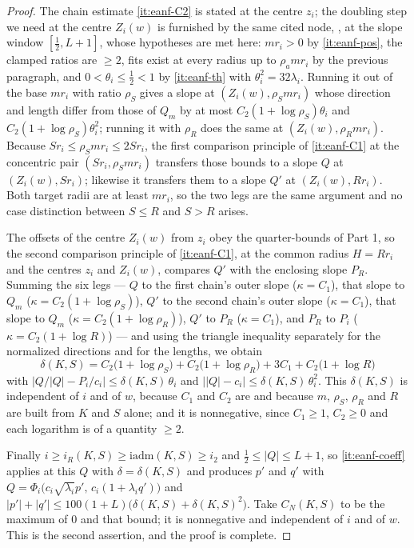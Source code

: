 \begin{proof}
The chain estimate \ref{it:eanf-C2} is stated at the centre $z_i$; the
doubling step we need at the centre $Z_i(w)$ is furnished by the same cited
node, , at the slope window
$[\tfrac12,L+1]$, whose hypotheses are met here: $mr_i>0$ by
\ref{it:eanf-pos}, the clamped ratios are $\ge2$, fits exist at every radius up
to $\rho_amr_i$ by the previous paragraph, and $0<\theta_i\le\tfrac12<1$ by
\ref{it:eanf-th} with $\theta_i^2=32\lambda_i$. Running it out of the base
$mr_i$ with ratio $\rho_S$ gives a slope at $(Z_i(w),\rho_Smr_i)$ whose
direction and length differ from those of $Q_m$ by at most
$C_2(1+\log\rho_S)\theta_i$ and $C_2(1+\log\rho_S)\theta_i^2$; running it with
$\rho_R$ does the same at $(Z_i(w),\rho_Rmr_i)$. Because $S r_i\le\rho_Smr_i\le
2Sr_i$, the first comparison principle of \ref{it:eanf-C1} at the concentric
pair $(Sr_i,\rho_Smr_i)$ transfers those bounds to a slope $Q$ at
$(Z_i(w),Sr_i)$; likewise it transfers them to a slope $Q'$ at
$(Z_i(w),Rr_i)$. Both target radii are at least $mr_i$, so the two legs are the
same argument and no case distinction between $S\le R$ and $S>R$ arises.

The offsets of the centre $Z_i(w)$ from $z_i$ obey the quarter-bounds of
Part 1, so the second comparison principle of \ref{it:eanf-C1}, at the common
radius $H=Rr_i$ and the centres $z_i$ and $Z_i(w)$, compares $Q'$ with the
enclosing slope $P_R$. Summing the six legs --- $Q$ to the first chain's outer
slope ($\kappa=C_1$), that slope to $Q_m$ ($\kappa=C_2(1+\log\rho_S)$), $Q'$ to
the second chain's outer slope ($\kappa=C_1$), that slope to $Q_m$
($\kappa=C_2(1+\log\rho_R)$), $Q'$ to $P_R$ ($\kappa=C_1$), and $P_R$ to $P_i$
($\kappa=C_2(1+\log R)$) --- and using the triangle inequality separately for
the normalized directions and for the lengths, we obtain
\[
  \delta(K,S)=C_2\bigl(1+\log\rho_S\bigr)+C_2\bigl(1+\log\rho_R\bigr)
    +3C_1+C_2\bigl(1+\log R\bigr)
\]
with $\bigl|Q/|Q|-P_i/c_i\bigr|\le\delta(K,S)\,\theta_i$ and
$\bigl||Q|-c_i\bigr|\le\delta(K,S)\,\theta_i^2$. This $\delta(K,S)$ is
independent of $i$ and of $w$, because $C_1$ and $C_2$ are and because $m$,
$\rho_S$, $\rho_R$ and $R$ are built from $K$ and $S$ alone; and it is
nonnegative, since $C_1\ge1$, $C_2\ge0$ and each logarithm is of a quantity
$\ge2$.

Finally $i\ge i_R(K,S)\ge\mathrm{iadm}(K,S)\ge i_2$ and
$\tfrac12\le|Q|\le L+1$, so \ref{it:eanf-coeff} applies at this $Q$ with
$\delta=\delta(K,S)$ and produces $p'$ and $q'$ with
$Q=\Phi_i\bigl(c_i\sqrt{\lambda_i}p',\,c_i(1+\lambda_iq')\bigr)$ and
$|p'|+|q'|\le100(1+L)\bigl(\delta(K,S)+\delta(K,S)^2\bigr)$. Take $C_N(K,S)$ to
be the maximum of $0$ and that bound; it is nonnegative and independent of $i$
and of $w$. This is the second assertion, and the proof is complete.
\end{proof}
